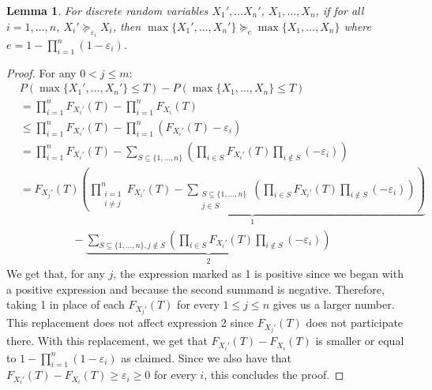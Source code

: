 \documentclass{article}
\newtheorem{lemma}{Lemma}
\begin{document}
\begin{lemma} \label{tightPalTheorem}
For discrete random variables $X_1', \dots X_n'$, $X_1, \dots,X_n$, if for all $i=1,\dots,n$,  $X_i' \succeq_{\varepsilon_i} X_i$,
then $\max\{X_1',\dots, X_n'\} \succeq_{e} \max\{X_1,\dots,X_n\}$ where $e=1-\prod_{i=1}^n (1-\varepsilon_i)$.
\end{lemma}
\begin{proof}
For any $0<j\leq m$:
{\small
\begin{align*} 
&P(\max\{X_1',\dots, X_n'\} {\leq} T) - P(\max\{X_1,\dots, X_n\} {\leq} T)\\
&=\prod_{i=1}^n F_{X_i'}(T)-\prod_{i=1}^n F_{X_i}(T)\\
&\leq \prod_{i=1}^n F_{X_i'}(T) - \prod_{i=1}^n (F_{X_i'}(T)-\varepsilon_i) \\
&= \prod_{i=1}^n F_{X_i'}(T)- \sum_{S\subseteq \{1,\dots,n\}} \left( \prod_{i\in S}F_{X_i'}(T) \prod_{i\notin S}(-\varepsilon_i) \right)\\
&=F_{X_j'}(T)\!\!\underbrace{\left(\!\prod_{\substack{i=1\\i\neq j}}^n \! F_{X_i'}(T)- \!\!\!\!\!\!\!\!\sum_{\substack{S\subseteq \{1,\dots,n\}\\ j\in S}} \!\!\!\! \left( \prod_{i\in S}F_{X_i'}(T) \prod_{i\notin S}(-\varepsilon_i) \right)\!\!\!\right)}_{1}\\
& \hspace{2cm} - \underbrace{\sum_{S\subseteq \{1,\dots,n\}, j\notin S} \left( \prod_{i\in 
S}F_{X_i'}(T) 
\prod_{i\notin S}(-\varepsilon_i) \right)}_{2}
\end{align*}}
We get that, for any $j$, the expression marked as 1 is positive since  we began with a positive 
expression and because the second summand is negative. 
Therefore, taking 1 in place of each $F_{X_j'}(T)$ for every $1 \leq j\leq n$ gives us a larger 
number. This replacement does not affect expression 2 since $F_{X_j'}(T)$ does not participate 
there. 
With this replacement, we get that $F_{X_i'}(T) - F_{X_i}(T)$ is smaller or equal to 
$1-\prod_{i=1}^n 
(1-\varepsilon_i)$ as claimed. Since we also have that $F_{X_i'}(T) - F_{X_i}(T) \geq 
\varepsilon_i \geq 0$ for every $i$, this concludes the proof.
\end{proof}
\end{document}
